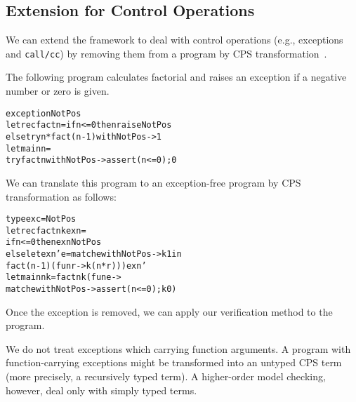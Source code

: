 \subsection{Extension for Control Operations}
\label{sec:control} We can extend the framework to deal with control
operations (e.g., exceptions and \texttt{call/cc}) by removing them
from a program by CPS transformation~\cite{Nielsen2001}.

The following program calculates factorial and raises an exception if
a negative number or zero is given.
\vspace{-5pt}
\begin{alltt}
 exception NotPos
 letrec fact n = if n <= 0 then raise NotPos
   else try n * fact (n - 1) with NotPos -> 1
 let main n =
   try fact n with NotPos -> assert (n <= 0); 0
\end{alltt}
\vspace{-5pt}
We can translate this program to an exception-free program by CPS transformation as follows:
\vspace{-5pt}
\begin{alltt}
 type exc = NotPos
 letrec fact n k exn =
   if n <= 0 then exn NotPos
   else let exn' e = match e with NotPos -> k 1 in
          fact (n - 1) (fun r -> k (n * r))) exn'
 let main n k = fact n k (fun e ->
   match e with NotPos -> assert (n <= 0); k 0)
\end{alltt}
\vspace{-5pt}
Once the exception is removed, we can apply our verification method to the
program.

We do not treat exceptions which carrying function arguments.
A program with function-carrying exceptions might be transformed into an
untyped CPS term (more precisely, a recursively typed term).  A
higher-order model checking, however, deal only with simply typed terms.
